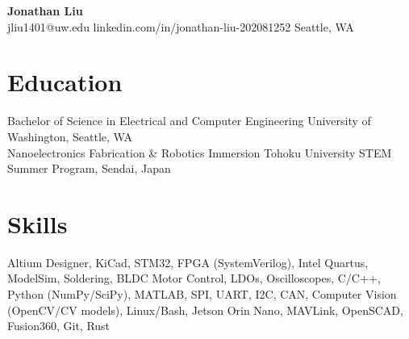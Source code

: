 \documentclass[11pt,letterpaper]{article}
\begin{document}
\begin{center}
{\LARGE \textbf{Jonathan Liu}}\\[2pt]
\small jliu1401@uw.edu \textbullet{} linkedin.com/in/jonathan-liu-202081252 \textbullet{} Seattle, WA
\end{center}
\section*{Education}
\noindent Bachelor of Science in Electrical and Computer Engineering \textbar{} University of Washington, Seattle, WA\\
\noindent Nanoelectronics Fabrication \& Robotics Immersion \textbar{} Tohoku University STEM Summer Program, Sendai, Japan\\
\section*{Skills}
Altium Designer, KiCad, STM32, FPGA (SystemVerilog), Intel Quartus, ModelSim, Soldering, BLDC Motor Control, LDOs, Oscilloscopes, C/C++, Python (NumPy/SciPy), MATLAB, SPI, UART, I2C, CAN, Computer Vision (OpenCV/CV models), Linux/Bash, Jetson Orin Nano, MAVLink, OpenSCAD, Fusion360, Git, Rust
\end{document}

